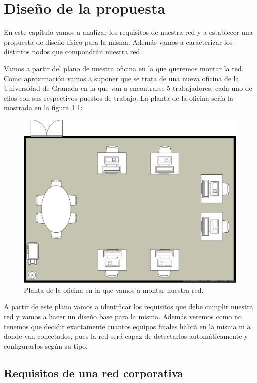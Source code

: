 \chapter{Diseño de la propuesta}

En este capítulo vamos a analizar los requisitos de nuestra red y a establecer una propuesta de diseño físico para la misma. Además vamos a caracterizar los distintos nodos que compondrán nuestra red.

Vamos a partir del plano de nuestra oficina en la que queremos montar la red. Como aproximación vamos a suponer que se trata de una nueva oficina de la Universidad de Granada en la que van a encontrarse 5 trabajadores, cada uno de ellos con sus respectivos puestos de trabajo. La planta de la oficina sería la mostrada en la figura \ref{fig:planta_oficina}:

\begin{figure}[!h]
    \centering
    \includegraphics[width=\textwidth]{imagenes/figuras/Plano oficina.pdf}
    \caption{Planta de la oficina en la que vamos a montar nuestra red.}
    \label{fig:planta_oficina}
\end{figure}

A partir de este plano vamos a identificar los requisitos que debe cumplir nuestra red y vamos a hacer un diseño base para la misma. Además veremos como no tenemos que decidir exactamente cuantos equipos finales habrá en la misma ni a donde van conectados, pues la red será capaz de detectarlos automáticamente y configurarlos según su tipo.

\section{Requisitos de una red corporativa}

